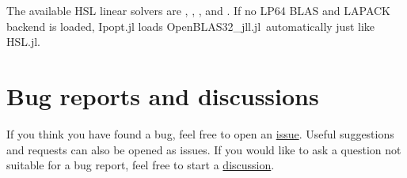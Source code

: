 \documentclass[gdweb]{geradwp}
\newcommand{\OpenBLASjll}{OpenBLAS32\_jll.jl}
\begin{document}
The available HSL linear solvers are , , ,  and .
If no LP64 BLAS and LAPACK backend is loaded, Ipopt.jl loads \OpenBLASjll~automatically just like HSL.jl.

\section{Bug reports and discussions}

If you think you have found a bug, feel free to open an \href{https://github.com/ralna/JuliaHSL/issues}{issue}.
Useful suggestions and requests can also be opened as issues.
If you would like to ask a question not suitable for a bug report, feel free to start a \href{https://github.com/ralna/JuliaHSL/discussions}{discussion}.

% 
% 
\end{document}
